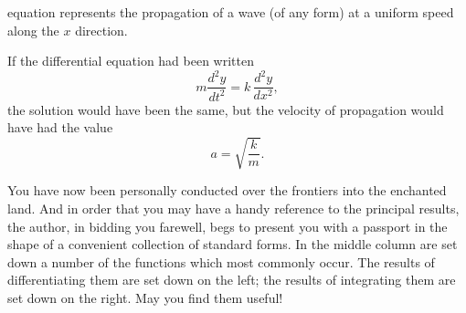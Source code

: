 \documentclass{ximera}
\begin{document}
equation represents the propagation of a wave (of any
form) at a uniform speed along the $x$ direction.

If the differential equation had been written
\[
m \frac{d^2y}{dt^2} = k\, \frac{d^2y}{dx^2},
\]
the solution would have been the same, but the
velocity of propagation would have had the value
\[
a = \sqrt{\frac{k}{m}}.
\]


You have now been personally conducted over the
frontiers into the enchanted land. And in order that
you may have a handy reference to the principal
results, the author, in bidding you farewell, begs to
present you with a passport in the shape of a convenient
collection of standard forms.
In the middle column are set down a number of the
functions which most commonly occur. The results
of differentiating them are set down on the left; the
results of integrating them are set down on the right.
May you find them useful!
\end{document}
